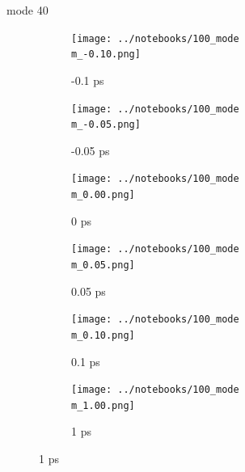 \documentclass{beamer}
\begin{document}
\renewcommand\m{40}
\begin{frame}{mode \m}
	\begin{figure}
		\centering
		\begin{subfigure}[b]{\w\textwidth}
			\centering
			\texttt{[image: ../notebooks/100\_mode\\m\_-0.10.png]}
			\caption{-0.1 ps}
		\end{subfigure}
		\begin{subfigure}[b]{\w\textwidth}
			\centering
			\texttt{[image: ../notebooks/100\_mode\\m\_-0.05.png]}
			\caption{-0.05 ps}
		\end{subfigure}
		\begin{subfigure}[b]{\w\textwidth}
			\centering
			\texttt{[image: ../notebooks/100\_mode\\m\_0.00.png]}
			\caption{0 ps}
		\end{subfigure}
		\begin{subfigure}[b]{\w\textwidth}
			\centering
			\texttt{[image: ../notebooks/100\_mode\\m\_0.05.png]}
			\caption{0.05 ps}
		\end{subfigure}
		\begin{subfigure}[b]{\w\textwidth}
			\centering
			\texttt{[image: ../notebooks/100\_mode\\m\_0.10.png]}
			\caption{0.1 ps}
		\end{subfigure}
		\begin{subfigure}[b]{\w\textwidth}
			\centering
			\texttt{[image: ../notebooks/100\_mode\\m\_1.00.png]}
			\caption{1 ps}
		\end{subfigure}
	\end{figure}
\end{frame}
\end{document}
